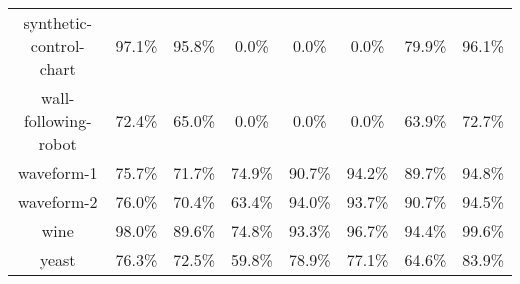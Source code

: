 \begin{table}
\begin{tabular}[h]{c c c c c c c c }
  synthetic-control-chart & 97.1\% & 95.8\% & 0.0\% & 0.0\% & 0.0\% & 79.9\% & 96.1\%  \\ 
  wall-following-robot & 72.4\% & 65.0\% & 0.0\% & 0.0\% & 0.0\% & 63.9\% & 72.7\%  \\ 
  waveform-1 & 75.7\% & 71.7\% & 74.9\% & 90.7\% & 94.2\% & 89.7\% & 94.8\%  \\ 
  waveform-2 & 76.0\% & 70.4\% & 63.4\% & 94.0\% & 93.7\% & 90.7\% & 94.5\%  \\ 
  wine & 98.0\% & 89.6\% & 74.8\% & 93.3\% & 96.7\% & 94.4\% & 99.6\%  \\ 
  yeast & 76.3\% & 72.5\% & 59.8\% & 78.9\% & 77.1\% & 64.6\% & 83.9\%  \\ 
 \end{tabular}
\end{table}